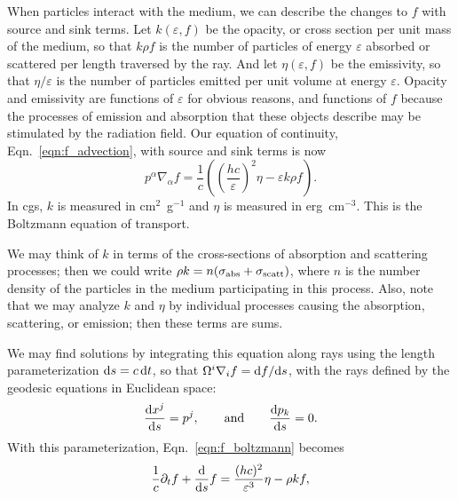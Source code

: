 When particles interact with the medium, we can describe the changes to $f$ with
source and sink terms.
Let $k(\varepsilon,f)$ be the opacity, or cross section per unit mass of the
medium, so that $k\rho f$ is the number of particles of energy
$\varepsilon$ absorbed or scattered per length traversed by the ray.
And let $\eta(\varepsilon,f)$ be the emissivity, so that
$\eta/\varepsilon$ is the number of particles emitted per
unit volume at energy $\varepsilon$.
Opacity and emissivity are functions of $\varepsilon$ for obvious reasons, and
functions of $f$ because the processes of emission and absorption that these
objects describe may be stimulated by the radiation field.
Our equation of continuity, Eqn.~\ref{eqn:f_advection},
with source and sink terms is now
\begin{equation}
  \label{eqn:f_boltzmann}
  p^\alpha\nabla_\alpha f = \frac{1}{c}
  \left( \left(\frac{hc}{\varepsilon}\right)^2\eta - \varepsilon k \rho f\right).
\end{equation}
In cgs, $k$ is measured in cm$^2$~g$^{-1}$ and $\eta$ is measured in
erg~cm$^{-3}$. This is the Boltzmann equation of transport.

We may think of $k$ in terms of the cross-sections of absorption and scattering
processes; then we could write $\rho k = n(\sigma_{\rm abs}+\sigma_{\rm scatt})$,
where $n$ is the number density of the particles in the medium participating in
this process.
Also, note that we may analyze $k$ and $\eta$ by individual processes causing the
absorption, scattering, or emission; then these terms are sums.

We may find solutions by integrating this equation along rays using the length
parameterization $\mathrm{d} s=c\,\mathrm{d} t$, so that
$\Omega^i\nabla_i f=\mathrm{d} f/\mathrm{d} s$, with the rays defined by
the geodesic equations in Euclidean space:
\begin{equation}
  \label{eqn:geo_straight_ray}
  \frac{\mathrm{d} x^j}{\mathrm{d} s}=p^j, \qquad {\rm and} \qquad
  \frac{\mathrm{d} p_k}{\mathrm{d} s}=0.
\end{equation}
With this parameterization, Eqn.~\ref{eqn:f_boltzmann} becomes
\begin{equation}
  \label{eqn:f_boltzmann_ray}
  \frac{1}{c} \partial_t f + \frac{\mathrm{d}}{\mathrm{d} s} f =
  \frac{(hc)^2}{\varepsilon^3}\eta - \rho k f,
\end{equation}

